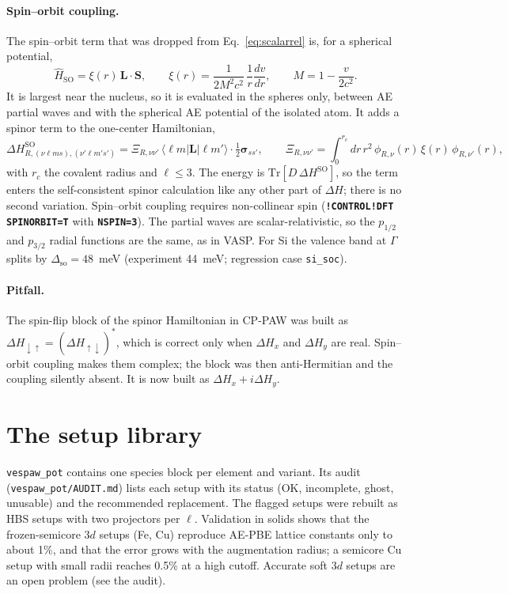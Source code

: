 \documentclass[11pt,a4paper,oneside]{book}
\newcommand{\key}[1]{\textbf{\texttt{#1}}}
\newcommand{\bra}[1]{\langle #1|}
\newcommand{\ket}[1]{|#1\rangle}
\begin{document}
\paragraph{Spin--orbit coupling.} The spin--orbit term that was dropped
from Eq.~\eqref{eq:scalarrel} is, for a spherical potential,
\begin{equation}
  \hat H_{\mathrm{SO}}=\xi(r)\,\bm L\cdot\bm S,\qquad
  \xi(r)=\frac1{2M^2c^2}\,\frac1r\frac{dv}{dr},
  \qquad M=1-\frac{v}{2c^2}.
\end{equation}
It is largest near the nucleus, so it is evaluated in the spheres only,
between AE partial waves and with the spherical AE potential of the
isolated atom. It adds a spinor term to the one-center Hamiltonian,
\begin{equation}
  \Delta H^{\mathrm{SO}}_{R,(\nu\ell m s),(\nu'\ell m's')}
  =\Xi_{R,\nu\nu'}\,\bra{\ell m}\bm L\ket{\ell m'}\cdot
  \tfrac12\bm\sigma_{ss'},
  \qquad
  \Xi_{R,\nu\nu'}=\int_0^{r_c}dr\,r^2\,\phi_{R,\nu}(r)\,\xi(r)\,\phi_{R,\nu'}(r),
\end{equation}
with $r_c$ the covalent radius and $\ell\le3$. The energy is
$\mathrm{Tr}[D\,\Delta H^{\mathrm{SO}}]$, so the term enters the
self-consistent spinor calculation like any other part of $\Delta H$; there
is no second variation. Spin--orbit coupling requires non-collinear spin
(\key{!CONTROL!DFT SPINORBIT=T} with \key{NSPIN=3}). The partial waves are
scalar-relativistic, so the $p_{1/2}$ and $p_{3/2}$ radial functions are
the same, as in VASP. For Si the valence band at $\Gamma$ splits by
$\Delta_{\mathrm{so}}=48$~meV (experiment 44~meV; regression case
\texttt{si\_soc}).

\paragraph{Pitfall.} The spin-flip block of the spinor Hamiltonian in
CP-PAW was built as $\Delta H_{\downarrow\uparrow}=(\Delta H_{\uparrow\downarrow})^*$, which is
correct only when $\Delta H_x$ and $\Delta H_y$ are real. Spin--orbit
coupling makes them complex; the block was then anti-Hermitian and the
coupling silently absent. It is now built as $\Delta H_x+i\Delta H_y$.

\section{The setup library}

\texttt{vespaw\_pot} contains one species block per element and variant.
Its audit (\texttt{vespaw\_pot/AUDIT.md}) lists each setup with its
status (OK, incomplete, ghost, unusable) and the recommended replacement.
The flagged setups were rebuilt as HBS setups with two projectors per
$\ell$. Validation in solids shows that the frozen-semicore $3d$ setups
(Fe, Cu) reproduce AE-PBE lattice constants only to about 1\%, and that
the error grows with the augmentation radius; a semicore Cu setup with
small radii reaches 0.5\% at a high cutoff. Accurate soft $3d$ setups are
an open problem (see the audit).
\end{document}
